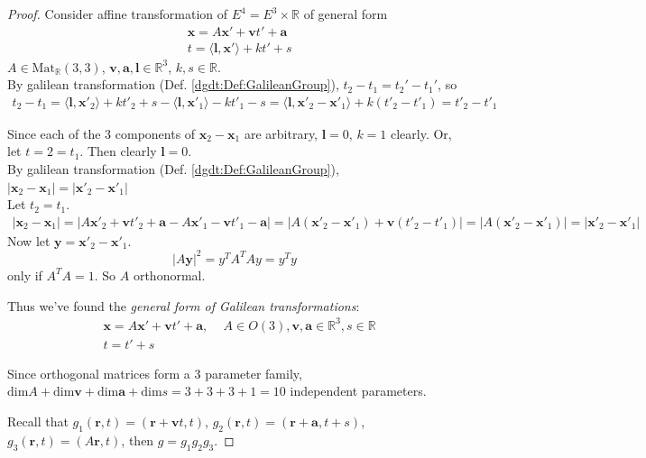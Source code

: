 \begin{proof}
Consider affine transformation of $E^4 = E^3 \times \mathbb{R}$ of general form
\[
\begin{aligned}
& \mathbf{x} = A\mathbf{x}' + \mathbf{v} t' + \mathbf{a} \\ 
& t = \langle \mathbf{l} , \mathbf{x}' \rangle + kt' + s 
\end{aligned}
\]
$A \in \text{Mat}_{\mathbb{R}}(3,3)$, $\mathbf{v}, \mathbf{a}, \mathbf{l} \in \mathbb{R}^3$, $k, s \in \mathbb{R}$. \\


By galilean transformation (Def. \ref{dgdt:Def:GalileanGroup}), $t_2 - t_1 = t_2' - t_1'$, so 
\[
\begin{gathered}
t_2 - t_1 = \langle \mathbf{l} , \mathbf{x}'_2 \rangle + k t'_2 + s - \langle \mathbf{l}, \mathbf{x}'_1 \rangle - k t'_1 - s = \langle \mathbf{l}, \mathbf{x}'_2 - \mathbf{x}'_1 \rangle + k (t'_2 - t'_1) = t'_2 - t'_1
\end{gathered}\]
	
Since each of the 3 components of $\mathbf{x}_2 - \mathbf{x}_1$ are arbitrary, $\mathbf{l} = 0$, $k=1$ clearly. Or, let $t=2 = t_1$. Then clearly $\mathbf{l}=0$. \\

By galilean transformation (Def. \ref{dgdt:Def:GalileanGroup}), $|\mathbf{x}_2 - \mathbf{x}_1 | = |\mathbf{x}'_2 - \mathbf{x}'_1 |$ \\

Let $t_2 = t_1$. \\
\[
\begin{gathered}
|\mathbf{x}_2 - \mathbf{x}_1 | = |A\mathbf{x}'_2 + \mathbf{v} t'_2 + \mathbf{a} - A \mathbf{x}'_1  - \mathbf{v}t'_1 - \mathbf{a}| = | A (\mathbf{x}'_2 - \mathbf{x}'_1 ) + \mathbf{v} (t'_2 - t'_1) | = | A(\mathbf{x}'_2 - \mathbf{x}'_1)| = | \mathbf{x}'_2 - \mathbf{x}'_1 |
\end{gathered}\]
Now let $\mathbf{y} = \mathbf{x}'_2 - \mathbf{x}'_1$.
\[
|A\mathbf{y} |^2 = y^T A^T A y = y^T y 
\]
only if $A^T A = 1$. So $A$ orthonormal.

Thus we've found the \emph{general form of Galilean transformations}:
\begin{equation}\label{dgdt:Eq:GeneralFormOfGalileanTransformations}
\boxed{ \begin{aligned} & \mathbf{x} = A \mathbf{x}' + \mathbf{v} t' + \mathbf{a}, \quad \, A\in O(3), \mathbf{v},\mathbf{a} \in \mathbb{R}^3, s\in\mathbb{R} \\
& t= t'+s \end{aligned} }
\end{equation}

Since orthogonal matrices form a 3 parameter family, $\text{dim}A + \text{dim}\mathbf{v} + \text{dim}\mathbf{a} + \text{dim}s = 3+ 3+3 + 1 = 10$ independent parameters.

Recall that $g_1(\mathbf{r}, t) = (\mathbf{r} + \mathbf{v} t, t)$, $g_2 (\mathbf{r}, t) = (\mathbf{r} + \mathbf{a}, t+s)$, $g_3 (\mathbf{r}, t) = (A\mathbf{r}, t)$, then $g= g_1g_2g_3$.

\end{proof}

